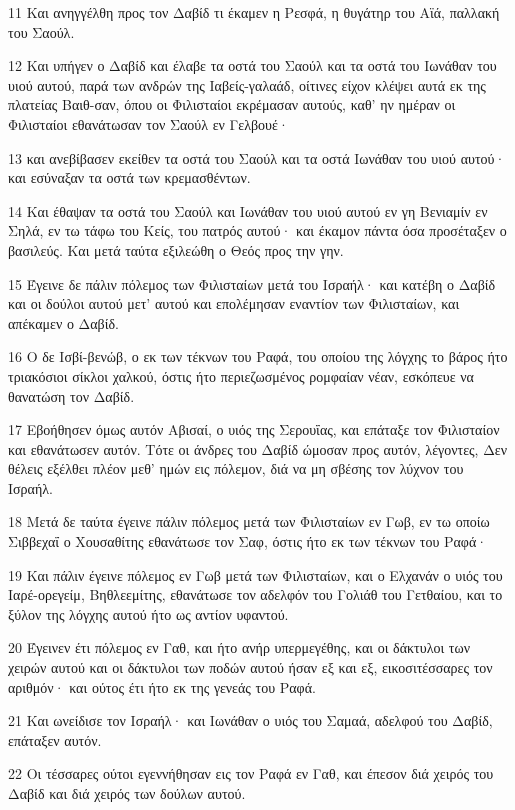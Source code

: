 \par 11 Και ανηγγέλθη προς τον Δαβίδ τι έκαμεν η Ρεσφά, η θυγάτηρ του Αϊά, παλλακή του Σαούλ.
\par 12 Και υπήγεν ο Δαβίδ και έλαβε τα οστά του Σαούλ και τα οστά του Ιωνάθαν του υιού αυτού, παρά των ανδρών της Ιαβείς-γαλαάδ, οίτινες είχον κλέψει αυτά εκ της πλατείας Βαιθ-σαν, όπου οι Φιλισταίοι εκρέμασαν αυτούς, καθ' ην ημέραν οι Φιλισταίοι εθανάτωσαν τον Σαούλ εν Γελβουέ·
\par 13 και ανεβίβασεν εκείθεν τα οστά του Σαούλ και τα οστά Ιωνάθαν του υιού αυτού· και εσύναξαν τα οστά των κρεμασθέντων.
\par 14 Και έθαψαν τα οστά του Σαούλ και Ιωνάθαν του υιού αυτού εν γη Βενιαμίν εν Σηλά, εν τω τάφω του Κείς, του πατρός αυτού· και έκαμον πάντα όσα προσέταξεν ο βασιλεύς. Και μετά ταύτα εξιλεώθη ο Θεός προς την γην.
\par 15 Έγεινε δε πάλιν πόλεμος των Φιλισταίων μετά του Ισραήλ· και κατέβη ο Δαβίδ και οι δούλοι αυτού μετ' αυτού και επολέμησαν εναντίον των Φιλισταίων, και απέκαμεν ο Δαβίδ.
\par 16 Ο δε Ισβί-βενώβ, ο εκ των τέκνων του Ραφά, του οποίου της λόγχης το βάρος ήτο τριακόσιοι σίκλοι χαλκού, όστις ήτο περιεζωσμένος ρομφαίαν νέαν, εσκόπευε να θανατώση τον Δαβίδ.
\par 17 Εβοήθησεν όμως αυτόν Αβισαί, ο υιός της Σερουΐας, και επάταξε τον Φιλισταίον και εθανάτωσεν αυτόν. Τότε οι άνδρες του Δαβίδ ώμοσαν προς αυτόν, λέγοντες, Δεν θέλεις εξέλθει πλέον μεθ' ημών εις πόλεμον, διά να μη σβέσης τον λύχνον του Ισραήλ.
\par 18 Μετά δε ταύτα έγεινε πάλιν πόλεμος μετά των Φιλισταίων εν Γωβ, εν τω οποίω Σιββεχαΐ ο Χουσαθίτης εθανάτωσε τον Σαφ, όστις ήτο εκ των τέκνων του Ραφά·
\par 19 Και πάλιν έγεινε πόλεμος εν Γωβ μετά των Φιλισταίων, και ο Ελχανάν ο υιός του Ιαρέ-ορεγείμ, Βηθλεεμίτης, εθανάτωσε τον αδελφόν του Γολιάθ του Γετθαίου, και το ξύλον της λόγχης αυτού ήτο ως αντίον υφαντού.
\par 20 Έγεινεν έτι πόλεμος εν Γαθ, και ήτο ανήρ υπερμεγέθης, και οι δάκτυλοι των χειρών αυτού και οι δάκτυλοι των ποδών αυτού ήσαν εξ και εξ, εικοσιτέσσαρες τον αριθμόν· και ούτος έτι ήτο εκ της γενεάς του Ραφά.
\par 21 Και ωνείδισε τον Ισραήλ· και Ιωνάθαν ο υιός του Σαμαά, αδελφού του Δαβίδ, επάταξεν αυτόν.
\par 22 Οι τέσσαρες ούτοι εγεννήθησαν εις τον Ραφά εν Γαθ, και έπεσον διά χειρός του Δαβίδ και διά χειρός των δούλων αυτού.

